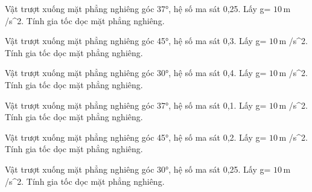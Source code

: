 \begin{ex}
Vật trượt xuống mặt phẳng nghiêng góc 37°, hệ số ma sát 0,25. Lấy g= $10\,\text{m}$ /s^2. Tính gia tốc dọc mặt phẳng nghiêng.
\end{ex}

\begin{ex}
Vật trượt xuống mặt phẳng nghiêng góc 45°, hệ số ma sát 0,3. Lấy g= $10\,\text{m}$ /s^2. Tính gia tốc dọc mặt phẳng nghiêng.
\end{ex}

\begin{ex}
Vật trượt xuống mặt phẳng nghiêng góc 30°, hệ số ma sát 0,4. Lấy g= $10\,\text{m}$ /s^2. Tính gia tốc dọc mặt phẳng nghiêng.
\end{ex}

\begin{bt}
Vật trượt xuống mặt phẳng nghiêng góc 37°, hệ số ma sát 0,1. Lấy g= $10\,\text{m}$ /s^2. Tính gia tốc dọc mặt phẳng nghiêng.
\end{bt}

\begin{bt}
Vật trượt xuống mặt phẳng nghiêng góc 45°, hệ số ma sát 0,2. Lấy g= $10\,\text{m}$ /s^2. Tính gia tốc dọc mặt phẳng nghiêng.
\end{bt}

\begin{bt}
Vật trượt xuống mặt phẳng nghiêng góc 30°, hệ số ma sát 0,25. Lấy g= $10\,\text{m}$ /s^2. Tính gia tốc dọc mặt phẳng nghiêng.
\end{bt}

